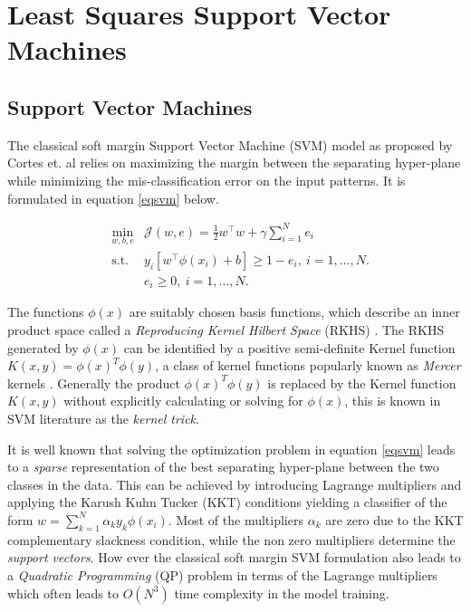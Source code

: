 \chapter{Least Squares Support Vector Machines}
\label{cha:1}
\section{Support Vector Machines} \label{SVM}
 
The classical soft margin Support Vector Machine (SVM) model as proposed by Cortes et. al \cite{Cortes} relies on maximizing the margin between the separating hyper-plane while minimizing the mis-classification error on the input patterns. It is formulated in equation \eqref{eqsvm} below.

\begin{equation}\label{eqsvm}
\begin{aligned}
& \underset{w,b,e}{\text{min}} &
 \mathcal{J}(w,e) = \frac{1}{2}w^{\intercal}w + \gamma\sum\limits_{i=1}^N e_{i} \\
& \text{s.t.} &
y_{i}[ w^{\intercal}\phi(x_{i})+b ] \geq 1 - e_{i},\ i=1,\ldots ,N. \\
& & e_{i} \geq 0,\ i=1,\ldots ,N.
\end{aligned}
\end{equation}

The functions $\phi(x)$ are suitably chosen basis functions, which describe an inner product space called a \textit{Reproducing Kernel Hilbert Space} (RKHS) \cite{N.Aronszjan1950}. The RKHS generated by $\phi(x)$ can be identified by a positive semi-definite Kernel function $K(x, y) = \phi(x)^{T}\phi(y)$, a class of kernel functions popularly known as \textit{Mercer} kernels \cite{Mercer}. Generally the product $\phi(x)^{T}\phi(y)$ is replaced by the Kernel function $K(x, y)$ without explicitly calculating or solving for $\phi(x)$, this is known in SVM literature as the \textit{kernel trick}.

It is well known that solving the optimization problem in equation \eqref{eqsvm} leads to a \textit{sparse} representation of the best separating hyper-plane between the two classes in the data. This can be achieved by introducing Lagrange multipliers and applying the Karush Kuhn Tucker (KKT) conditions yielding a classifier of the form $w = \sum\limits_{k=1}^N \alpha_k y_k \phi(x_{i})$. Most of the multipliers $\alpha_k$ are zero due to the KKT complementary slackness condition, while the non zero multipliers determine the \textit{support vectors}. How ever the classical soft margin SVM formulation also leads to a \textit{Quadratic Programming} (QP) problem in terms of the Lagrange multipliers which often leads to $O(N^3)$ time complexity in the model training.

